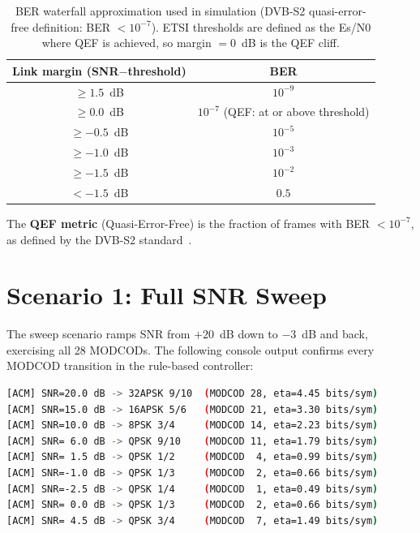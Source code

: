 \documentclass[12pt,a4paper]{report}
\begin{document}
\begin{table}[H]
\centering
\caption{BER waterfall approximation used in simulation (DVB-S2 quasi-error-free
  definition: BER $< 10^{-7}$).  ETSI thresholds are defined as the Es/N0 where
  QEF is achieved, so margin $= 0$~dB is the QEF cliff.}
\label{tab:ber_model}
\begin{tabular}{cc}
\toprule
\textbf{Link margin (SNR$-$threshold)} & \textbf{BER} \\
\midrule
$\geq 1.5$~dB   & $10^{-9}$ \\
$\geq 0.0$~dB   & $10^{-7}$ \quad (QEF: at or above threshold) \\
$\geq -0.5$~dB  & $10^{-5}$ \\
$\geq -1.0$~dB  & $10^{-3}$ \\
$\geq -1.5$~dB  & $10^{-2}$ \\
$< -1.5$~dB     & $0.5$     \\
\bottomrule
\end{tabular}
\end{table}

The \textbf{QEF metric} (Quasi-Error-Free) is the fraction of frames with
BER $< 10^{-7}$, as defined by the DVB-S2 standard~\cite{etsi_dvbs2}.

\section{Scenario 1: Full SNR Sweep}
\label{sec:result_sweep}

The sweep scenario ramps SNR from $+20$~dB down to $-3$~dB and back,
exercising all 28 MODCODs.  The following console output confirms every
MODCOD transition in the rule-based controller:

\begin{lstlisting}[language=bash, caption={Selected MODCOD transitions during full SNR sweep (rule-based ACM)}]
[ACM] SNR=20.0 dB -> 32APSK 9/10  (MODCOD 28, eta=4.45 bits/sym)
[ACM] SNR=15.0 dB -> 16APSK 5/6   (MODCOD 21, eta=3.30 bits/sym)
[ACM] SNR=10.0 dB -> 8PSK 3/4     (MODCOD 14, eta=2.23 bits/sym)
[ACM] SNR= 6.0 dB -> QPSK 9/10    (MODCOD 11, eta=1.79 bits/sym)
[ACM] SNR= 1.5 dB -> QPSK 1/2     (MODCOD  4, eta=0.99 bits/sym)
[ACM] SNR=-1.0 dB -> QPSK 1/3     (MODCOD  2, eta=0.66 bits/sym)
[ACM] SNR=-2.5 dB -> QPSK 1/4     (MODCOD  1, eta=0.49 bits/sym)
[ACM] SNR= 0.0 dB -> QPSK 1/3     (MODCOD  2, eta=0.66 bits/sym)
[ACM] SNR= 4.5 dB -> QPSK 3/4     (MODCOD  7, eta=1.49 bits/sym)
\end{lstlisting}
\end{document}
